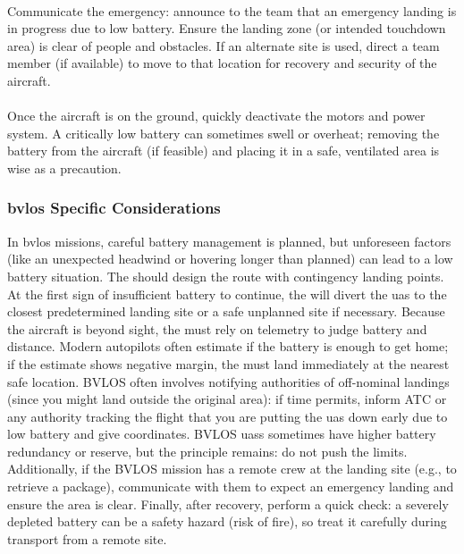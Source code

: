                 \paragraph{} Communicate the emergency: announce to the team that an emergency landing is in progress due to low battery. Ensure the landing zone (or intended touchdown area) is clear of people and obstacles. If an alternate site is used, direct a team member (if available) to move to that location for recovery and security of the aircraft.
                
                \paragraph{} Once the aircraft is on the ground, quickly deactivate the motors and power system. A critically low battery can sometimes swell or overheat; removing the battery from the aircraft (if feasible) and placing it in a safe, ventilated area is wise as a precaution.
 
            \subsubsection{\ac{bvlos} Specific Considerations} In \ac{bvlos} missions, careful battery management is planned, but unforeseen factors (like an unexpected headwind or hovering longer than planned) can lead to a low battery situation. The  should design the route with contingency landing points. At the first sign of insufficient battery to continue, the  will divert the \ac{uas} to the closest predetermined landing site or a safe unplanned site if necessary. Because the aircraft is beyond sight, the  must rely on telemetry to judge battery and distance. Modern autopilots often estimate if the battery is enough to get home; if the estimate shows negative margin, the  must land immediately at the nearest safe location. BVLOS often involves notifying authorities of off-nominal landings (since you might land outside the original area): if time permits, inform ATC or any authority tracking the flight that you are putting the \ac{uas} down early due to low battery and give coordinates. BVLOS \acp{uas} sometimes have higher battery redundancy or reserve, but the principle remains: do not push the limits. Additionally, if the BVLOS mission has a remote crew at the landing site (e.g., to retrieve a package), communicate with them to expect an emergency landing and ensure the area is clear. Finally, after recovery, perform a quick check: a severely depleted battery can be a safety hazard (risk of fire), so treat it carefully during transport from a remote site.
 
